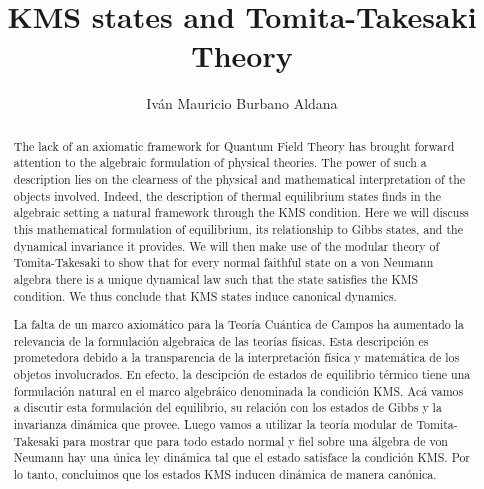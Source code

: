 \documentclass{article}
\title{KMS states and Tomita-Takesaki Theory}
\author{Iván Mauricio Burbano Aldana}
\begin{document}
\maketitle

\begin{abstract}

The lack of an axiomatic framework for Quantum Field Theory has brought forward attention to the algebraic formulation of physical theories. The  power of such a description lies on the clearness of the physical and mathematical interpretation of the objects involved. Indeed, the description of thermal equilibrium states finds in the algebraic setting a natural framework through the KMS condition. Here we will discuss this mathematical formulation of equilibrium, its relationship to Gibbs states, and the dynamical invariance it provides. We will then make use of the modular theory of Tomita-Takesaki to show that for every normal faithful state on a von Neumann algebra there is a unique dynamical law such that the state satisfies the KMS condition. We thus conclude that KMS states induce canonical dynamics.

\end{abstract}

\begin{otherlanguage}{spanish}

\begin{abstract}

La falta de un marco axiomático para la Teoría Cuántica de Campos ha aumentado la relevancia de la formulación algebraica de las teorías físicas. Esta descripción es prometedora debido a la transparencia de la interpretación física y matemática de los objetos involucrados. En efecto, la descipción de estados de equilibrio térmico tiene una formulación natural en el marco algebráico denominada la condición KMS. Acá vamos a discutir esta formulación del equilibrio, su relación con los estados de Gibbs y la invarianza dinámica que provee. Luego vamos a utilizar la teoría modular de Tomita-Takesaki para mostrar que para todo estado normal y fiel sobre una álgebra de von Neumann hay una única ley dinámica tal que el estado satisface la condición KMS. Por lo tanto, concluimos que los estados KMS inducen dinámica de manera canónica. 

\end{abstract}

\end{otherlanguage}

\nocite{*}



\end{document}
